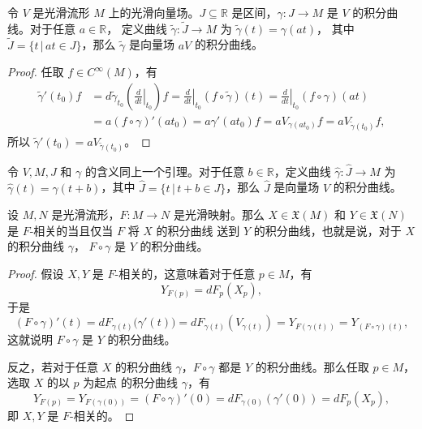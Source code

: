 \documentclass[fontset=none]{Notes}
\begin{document}
\begin{lemma}[缩放引理]
  令 $V$ 是光滑流形 $M$ 上的光滑向量场。$J\subseteq \mathbb{R}$
  是区间，$\gamma:J\to M$ 是 $V$ 的积分曲线。对于任意 $a\in \mathbb{R}$，
  定义曲线 $\tilde \gamma:\tilde{J}\to M$ 为 $\tilde{\gamma}(t)=\gamma(at)$，
  其中 $\tilde{J}=\{t\,|\, at\in J\}$，那么 $\tilde{\gamma}$ 是向量场
  $aV$ 的积分曲线。
\end{lemma}
\begin{proof}
  任取 $f\in C^\infty(M)$，有
  \begin{align*}
    \tilde{\gamma}'(t_0)f&=d\tilde{\gamma}_{t_0}\left(
      \left.\frac{d}{dt}\right|_{t_0}
    \right)f
    =\left.\frac{d}{dt}\right|_{t_0}(f\circ\tilde\gamma)(t)
    =\left.\frac{d}{dt}\right|_{t_0}(f\circ\gamma)(at)\\
    &=a (f\circ\gamma)'(at_0)
    =a\gamma'(at_0)f=aV_{\gamma(at_0)}f=
    aV_{\tilde{\gamma}(t_0)}f,
  \end{align*}
  所以 $\tilde{\gamma}'(t_0)=aV_{\tilde{\gamma}(t_0)}$。
\end{proof}

\begin{lemma}[平移引理]
  令 $V,M,J$ 和 $\gamma$ 的含义同上一个引理。对于任意
  $b\in \mathbb{R}$，定义曲线 $\hat\gamma:\hat J\to M$
  为 $\hat \gamma(t)=\gamma(t+b)$，其中
  $\hat J=\{t\,|\, t+b\in J\}$，那么 $\hat J$ 是向量场
  $V$ 的积分曲线。
\end{lemma}

\begin{proposition}[积分曲线的自然性]\label{prop:naturality of integral curve}
  设 $M,N$ 是光滑流形，$F:M\to N$ 是光滑映射。那么 $X\in \mathfrak{X}(M)$
  和 $Y\in \mathfrak{X}(N)$ 是 $F$-相关的当且仅当 $F$ 将 $X$ 的积分曲线
  送到 $Y$ 的积分曲线，也就是说，对于 $X$ 的积分曲线 $\gamma$，
  $F\circ\gamma$ 是 $Y$ 的积分曲线。
\end{proposition}
\begin{proof}
  假设 $X,Y$ 是 $F$-相关的，这意味着对于任意 $p\in M$，有
  \[
    Y_{F(p)}=dF_p(X_p),
  \]
  于是
  \[
    (F\circ\gamma)'(t)
    =dF_{\gamma(t)}\bigl(\gamma'(t)\bigr)
    =dF_{\gamma(t)}(V_{\gamma(t)})=Y_{F(\gamma(t))}
    =Y_{(F\circ\gamma)(t)},
  \]
  这就说明 $F\circ\gamma$ 是 $Y$ 的积分曲线。

  反之，若对于任意 $X$ 的积分曲线 $\gamma$，$F\circ\gamma$ 都是
  $Y$ 的积分曲线。那么任取 $p\in M$，选取 $X$ 的以 $p$ 为起点
  的积分曲线 $\gamma$，有
  \[
    Y_{F(p)}=Y_{F(\gamma(0))}=(F\circ\gamma)'(0)
    =dF_{\gamma(0)}(\gamma'(0))=dF_p(X_p),  
  \]
  即 $X,Y$ 是 $F$-相关的。
\end{proof}
\end{document}
